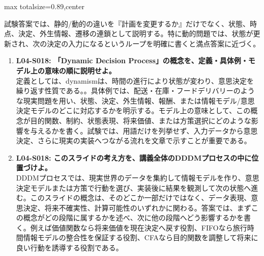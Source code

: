 \begin{minipage}[t]{0.58\textwidth}
\begin{adjustbox}{max totalsize={\textwidth}{0.89\textheight},center}
\begin{minipage}{\textwidth}
試験答案では、静的/動的の違いを『計画を変更するか』だけでなく、状態、時点、決定、外生情報、遷移の連鎖として説明する。特に動的問題では、状態が更新され、次の決定の入力になるというループを明確に書くと満点答案に近づく。\par{}\begin{enumerate}\item \textbf{L04-S018: 「Dynamic Decision Process」の概念を、定義・具体例・モデル上の意味の順に説明せよ。}\\定義としては、dynamismは、時間の進行により状態が変わり、意思決定を繰り返す性質である。。具体例では、配送・在庫・フードデリバリーのような現実問題を用い、状態、決定、外生情報、報酬、または情報モデル/意思決定モデルのどこに対応するかを明示する。モデル上の意味として、この概念が目的関数、制約、状態表現、将来価値、または方策選択にどのような影響を与えるかを書く。試験では、用語だけを列挙せず、入力データから意思決定、さらに現実の実装へつながる流れを文章で示すことが重要である。\item \textbf{L04-S018: このスライドの考え方を、講義全体のDDDMプロセスの中に位置づけよ。}\\DDDMプロセスでは、現実世界のデータを集約して情報モデルを作り、意思決定モデルまたは方策で行動を選び、実装後に結果を観測して次の状態へ進む。このスライドの概念は、そのどこか一部だけではなく、データ表現、意思決定、将来不確実性、計算可能性のいずれかに関わる。答案では、まずこの概念がどの段階に属するかを述べ、次に他の段階へどう影響するかを書く。例えば価値関数なら将来価値を現在決定へ戻す役割、FIFOなら旅行時間情報モデルの整合性を保証する役割、CFAなら目的関数を調整して将来に良い行動を誘導する役割である。\end{enumerate}
\end{minipage}
\end{adjustbox}
\end{minipage}


